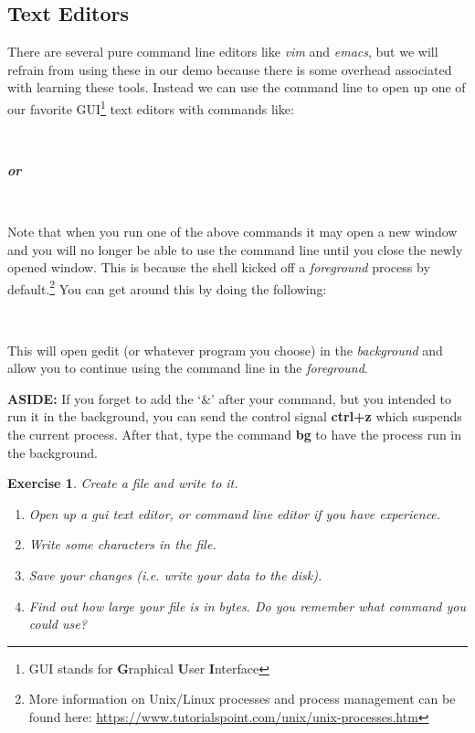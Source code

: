 \documentclass[oneside]{book}
\newcommand{\commandline}[1]{\begin{center} \colorbox{Dark}{\textcolor{white}{#1}} \end{center}}
\newtheorem{ex}{Exercise}[chapter]
\begin{document}
\subsection{Text Editors}
There are several pure command line editors like \textit{vim} and \textit{emacs}, but we will refrain from using these in our demo because there is some overhead associated with learning these tools. Instead we can use the command line to open up one of our favorite GUI\footnote{GUI stands for \textbf{G}raphical \textbf{U}ser \textbf{I}nterface} text editors with commands like: 
\commandline{gedit myfile}
\begin{center}
    \textbf{\textit{or}}
\end{center}
\commandline{atom myfile}
Note that when you run one of the above commands it may open a new window and you will no longer be able to use the command line until you close the newly opened window. This is because the shell kicked off a \textit{foreground} process by default.\footnote{More information on Unix/Linux processes and process management can be found here: \url{https://www.tutorialspoint.com/unix/unix-processes.htm}} You can get around this by doing the following:
\commandline{gedit myfile \&}
This will open gedit (or whatever program you choose) in the \textit{background} and allow you to continue using the command line in the \textit{foreground}.

\textbf{ASIDE: } If you forget to add the `\&' after your command, but you intended to run it in the background, you can send the control signal \textbf{ctrl+z} which suspends the current process. After that, type the command \textbf{bg} to have the process run in the background.\\

\begin{ex} Create a file and write to it.
    \begin{enumerate}
        \item Open up a gui text editor, or command line editor if you have experience.
        \item Write some characters in the file.
        \item Save your changes (i.e. write your data to the disk).
        \item Find out how large your file is in bytes. Do you remember what command you could use?
    \end{enumerate}
    
\end{ex}
\end{document}
